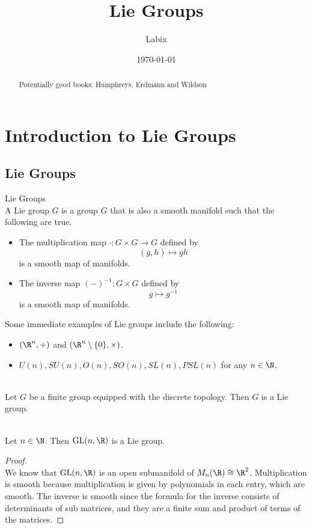 \documentclass[a4paper]{article}
\title{Lie Groups}
\author{Labix}
\date{\today}
\begin{document}
\maketitle
\begin{abstract}
Potentially good books: Humphreys, Erdmann and Wildson
\end{abstract}
\pagebreak
\tableofcontents
\pagebreak
\section{Introduction to Lie Groups}
\subsection{Lie Groups}
\begin{defn}{Lie Groups}{} \\A Lie group $G$ is a group $G$ that is also a smooth manifold such that the following are true. 
\begin{itemize}
\item The multiplication map $\cdot:G\times G\to G$ defined by $$(g,h)\mapsto gh$$ is a smooth map of manifolds. 
\item The inverse map $(-)^{-1}:G\times G$ defined by $$g\mapsto g^{-1}$$ is a smooth map of manifolds. 
\end{itemize}
\end{defn}

Some immediate examples of Lie groups include the following: 
\begin{itemize}
\item $(\R^n,+)$ and $(\R^n\setminus\{0\},\times)$. 
\item $U(n), SU(n), O(n), SO(n), SL(n), PSL(n)$ for any $n\in\N$. 
\end{itemize}

\begin{eg}{}{}\\
Let $G$ be a finite group equipped with the discrete topology. Then $G$ is a Lie group. 
\end{eg}

\begin{eg}{}{}\\
Let $n\in\N$. Then $\text{GL}(n,\R)$ is a Lie group. 
\begin{proof}\\
We know that $\text{GL}(n,\R)$ is an open submanifold of $M_n(\R)\cong\R^2$. Multiplication is smooth because multiplication is given by polynomials in each entry, which are smooth. The inverse is smooth since the formula for the inverse consists of determinants of sub matrices, and they are a finite sum and product of terms of the matrices. 
\end{proof}
\end{eg}
\end{document}

